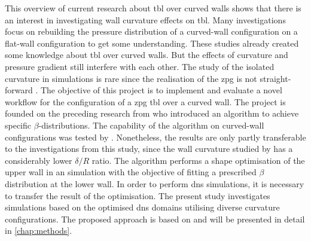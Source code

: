 This overview of current research about \acrshort{tbl} over curved walls shows that there is an interest in investigating wall curvature effects on \acrshort{tbl}.
Many investigations focus on rebuilding the pressure distribution of a curved-wall configuration on a flat-wall configuration to get some understanding.
These studies already created some knowledge about \acrshort{tbl} over curved walls.
But the effects of curvature and pressure gradient still interfere with each other.
The study of the isolated curvature in simulations is rare since the realisation of the \acrshort{zpg} is not straight-forward \citep{appelbaum_systematic_2025}.
The objective of this project is to implement and evaluate a novel workflow for the configuration of a \acrshort{zpg} \acrshort{tbl} over a curved wall.
The project is founded on the preceding research from \citet{morita_applying_2022} who introduced an algorithm to achieve specific $\beta$-distributions.
The capability of the algorithm on curved-wall configurations was tested by \citet{ganagdhar_bayesian_2025}.
Nonetheless, the results are only partly transferable to the investigations from this study, since the wall curvature studied by \citet{ganagdhar_bayesian_2025} has a considerably lower $\delta/R$ ratio. 
The algorithm performs a shape optimisation of the upper wall in an  simulation with the objective of fitting a prescribed $\beta$ distribution at the lower wall.
In order to perform \acrshort{dns} simulations, it is necessary to transfer the result of the optimisation.
The present study investigates simulations based on the optimised \acrshort{dns} domains utilising diverse curvature configurations.   
The proposed approach is based on \citet{schlatter_leveraging_2025} and will be presented in detail in \autoref{chap:methods}.



